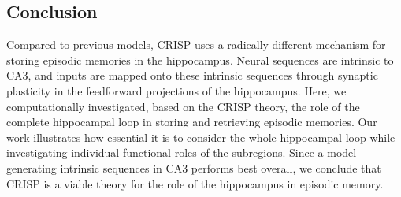 \documentclass[utf8]{frontiersSCNS} %
\begin{document}




\subsection{Conclusion} 
Compared to previous models, CRISP uses a radically different mechanism for storing episodic memories in the hippocampus. Neural sequences are intrinsic to CA3, and inputs are mapped onto these intrinsic sequences through synaptic plasticity in the feedforward projections of the hippocampus. Here, we computationally investigated, based on the CRISP theory, the role of the complete hippocampal loop in storing and retrieving episodic memories. Our work illustrates how essential it is to consider the whole hippocampal loop while investigating individual functional roles of the subregions. Since a model generating intrinsic sequences in CA3 performs best overall, we conclude that CRISP is a viable theory for the role of the hippocampus in episodic memory.




\end{document}
